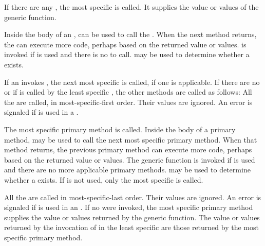 \beginlist
                               
\itemitem{\bull} If there are any , the most specific
 is called.  It supplies the value or values of the
generic function.

\itemitem{\bull} Inside the body of an , 
 can be used to call the .  When the next
method returns, the  can execute more code,
perhaps based on the returned value or values.
 is invoked if  is used and
there is no  to call.  
may be used to determine whether a  exists.

\itemitem{\bull} 
If an  invokes ,
the next most specific 
is called, if one is applicable.  If there are no  
or if  is called by the least
specific , the other methods are called as
follows:
\beginlist
\itemitem{--} All the  are called, in
most-specific-first order.  Their values are ignored.
An error is signaled if  is used in a
.

\itemitem{--} The most specific primary method is called.  Inside the
body of a primary method,  may be used to call
the next most specific primary method.  When that method returns, the
previous primary method can execute more code, perhaps based on the
returned value or values.  The generic function 
is invoked if  is used and there are no more
applicable primary methods.   may be
used to determine whether a  exists.  If 
is not used, only the most specific  is called.

\itemitem{--} All the  are called in
most-specific-last order.  Their values are ignored.
An error is signaled if  is used in an
.
\endlist
\itemitem{\bull} If no  were invoked, the most
specific primary method supplies the value or values returned by the
generic function.  The value or values returned by the invocation of
 in the least specific  are
those returned by the most specific primary method.

